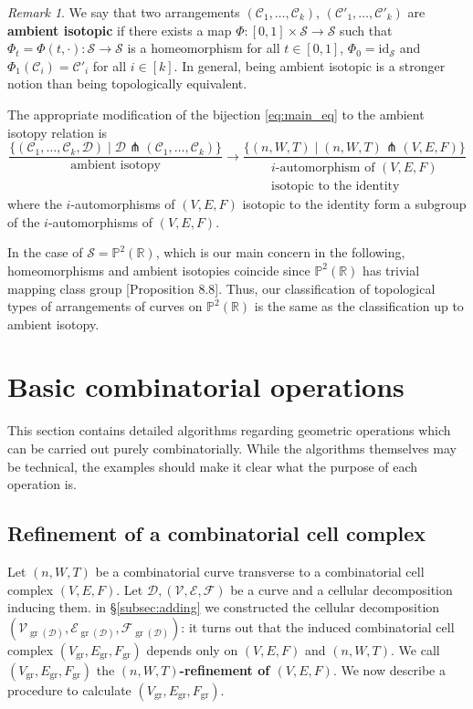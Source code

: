 \documentclass[11pt,reqno]{amsart}
\theoremstyle{plain}
\theoremstyle{definition}
\theoremstyle{remark}
\newtheorem{remark}[subsection]{Remark}
\numberwithin{equation}{subsection}
\newcommand*{\bbP}{\mathbb{P}}
\newcommand*{\bbR}{\mathbb{R}}
\newcommand*{\calC}{\mathcal{C}}
\newcommand*{\calD}{\mathcal{D}}
\newcommand*{\calE}{\mathcal{E}}
\newcommand*{\calF}{\mathcal{F}}
\newcommand*{\calS}{\mathcal{S}}
\newcommand*{\calV}{\mathcal{V}}
\newcommand*{\id}{\mathrm{id}}
\DeclareMathOperator{\gr}{gr}
\begin{document}
\begin{remark}\label{rem:ambient}
    We say that two arrangements $(\calC_1,\dots,\calC_k)$, $(\calC'_1,\dots,\calC'_k)$ are \textbf{ambient isotopic} if there exists a map $\Phi\colon[0,1]\times\calS\to\calS$ such that $\Phi_t=\Phi(t,\cdot)\colon\calS\to\calS$ is a homeomorphism for all $t\in[0,1]$, $\Phi_0=\id_{\calS}$ and $\Phi_1(\calC_i)=\calC'_i$ for all $i\in[k]$. In general, being ambient isotopic is a stronger notion than being topologically equivalent.

    The appropriate modification of the bijection \eqref{eq:main_eq} to the ambient isotopy relation is
    \begin{equation}
        \frac{\{(\calC_1,\dots,\calC_k,\calD)\mid\calD\pitchfork(\calC_1,\dots,\calC_k)\}}{\text{ambient isotopy}}\to\frac{\{(n,W,T)\mid(n,W,T)\pitchfork(V,E,F)\}}{\substack{\text{$i$-automorphism of $(V,E,F)$}\\\text{isotopic to the identity}}}
    \end{equation}
    where the $i$-automorphisms of $(V,E,F)$ isotopic to the identity form a subgroup of the $i$-automorphisms of $(V,E,F)$.

    In the case of $\calS=\bbP^2(\bbR)$, which is our main concern in the following, homeomorphisms and ambient isotopies coincide since $\bbP^2(\bbR)$ has trivial mapping class group \cite{beguin2020fixed}[Proposition 8.8]. Thus, our classification of topological types of arrangements of curves on $\bbP^2(\bbR)$ is the same as the classification up to ambient isotopy.
\end{remark}

\section{Basic combinatorial operations}\label{sec:ops}

This section contains detailed algorithms regarding geometric operations which can be carried out purely combinatorially. While the algorithms themselves may be technical, the examples should make it clear what the purpose of each operation is.

\subsection{Refinement of a combinatorial cell complex}\label{subsec:refinement}

Let $(n,W,T)$ be a combinatorial curve transverse to a combinatorial cell complex $(V,E,F)$. Let $\calD,(\calV,\calE,\calF)$ be a curve and a cellular decomposition inducing them. in §\ref{subsec:adding} we constructed the cellular decomposition $(\calV_{\gr(\calD)},\calE_{\gr(\calD)},\calF_{\gr(\calD)})$: it turns out that the induced combinatorial cell complex $(V_{\gr},E_{\gr},F_{\gr})$ depends only on $(V,E,F)$ and $(n,W,T)$. We call $(V_{\gr},E_{\gr},F_{\gr})$ the \textbf{$(n,W,T)$-refinement of $(V,E,F)$}.
We now describe a procedure to calculate $(V_{\gr},E_{\gr},F_{\gr})$.
\end{document}
